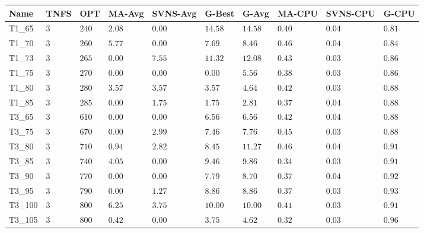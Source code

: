 \begin{center}
    \begin{table}[]
    \centering
    \begin{tabular}{|lll|l|l|ll|lll|}
\hline
Name     & TNFS   & OPT  & MA-Avg & SVNS-Avg & G-Best & G-Avg & MA-CPU & SVNS-CPU & G-CPU \\
\hline
T1\_65   & $3$    & $240$  & $2.08$   & $\bm{0.00}$     & $14.58$      & $14.58$     & $0.40$   & $0.04$     & $0.81$      \\
T1\_70   & $3$    & $260$  & $5.77$   & $\bm{0.00}$     & $7.69 $      & $8.46 $     & $0.46$   & $0.04$     & $0.84$      \\
T1\_73   & $3$    & $265$  & $\bm{0.00}$   & $7.55$     & $11.32$      & $12.08$     & $0.43$   & $0.03$     & $0.86$      \\
T1\_75   & $3$    & $270$  & $\bm{0.00}$   & $\bm{0.00}$     & $\bm{0.00} $      & $5.56 $     & $0.38$   & $0.03$     & $0.86$      \\
T1\_80   & $3$    & $280$  & $3.57$   & $3.57$     & $3.57 $      & $4.64 $     & $0.42$   & $0.03$     & $0.88$      \\
T1\_85   & $3$    & $285$  & $\bm{0.00}$   & $1.75$     & $1.75 $      & $2.81 $     & $0.37$   & $0.04$     & $0.88$      \\
\hline
T3\_65   & $3$    & $610$  & $\bm{0.00}$   & $\bm{0.00}$     & $6.56$       & $6.56 $     & $0.42$   & $0.04$     & $0.88$      \\
T3\_75   & $3$    & $670$  & $\bm{0.00}$   & $2.99$     & $7.46$       & $7.76 $     & $0.45$   & $0.03$     & $0.88$      \\
T3\_80   & $3$    & $710$  & $0.94$   & $2.82$     & $8.45$       & $11.27$     & $0.46$   & $0.04$     & $0.91$      \\
T3\_85   & $3$    & $740$  & $4.05$   & $\bm{0.00}$     & $9.46$       & $9.86 $     & $0.34$   & $0.03$     & $0.91$      \\
T3\_90   & $3$    & $770$  & $\bm{0.00}$   & $\bm{0.00}$     & $7.79$       & $8.70 $     & $0.37$   & $0.04$     & $0.92$      \\
T3\_95   & $3$    & $790$  & $\bm{0.00}$   & $1.27$     & $8.86$       & $8.86 $     & $0.37$   & $0.03$     & $0.93$      \\
T3\_100  & $3$    & $800$  & $6.25$   & $3.75$     & $10.00$      & $10.00$     & $0.41$   & $0.03$     & $0.91$      \\
T3\_105  & $3$    & $800$  & $0.42$   & $\bm{0.00}$     & $3.75$       & $4.62 $     & $0.32$   & $0.03$     & $0.96$      \\

\end{tabular}
\end{table}
\end{center}

